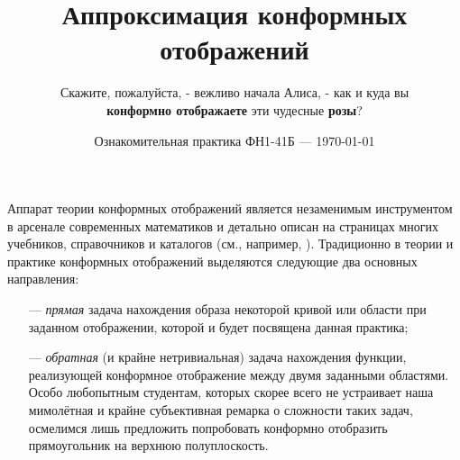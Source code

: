 \documentclass{article}
\title{\textbf{Аппроксимация конформных отображений}}
\author{Скажите, пожалуйста, - вежливо начала Алиса, - как и куда вы \\
\textbf{конформно отображаете} эти чудесные \textbf{розы}?}
\date{Ознакомительная практика ФН1-41Б --- \today}
\theoremstyle{definition}
\begin{document}
\maketitle
Аппарат теории конформных отображений является незаменимым инструментом в арсенале современных математиков и детально описан на страницах многих учебников, справочников и каталогов (см., например, \cite{1}\cite{2}\cite{3}). Традиционно в теории и практике конформных отображений  выделяются следующие два основных направления:
\begin{itemize}
\item[---] \textit{прямая} задача нахождения образа некоторой кривой или области при заданном отображении, которой и будет посвящена данная практика;
\item[---] \textit{обратная} (и крайне нетривиальная) задача нахождения функции, реализующей конформное отображение между двумя заданными областями. Особо любопытным студентам, которых скорее всего не устраивает наша мимолётная и крайне субъективная ремарка о сложности таких задач, осмелимся лишь предложить попробовать конформно отобразить прямоугольник на верхнюю полуплоскость.
\end{itemize}
\end{document}

